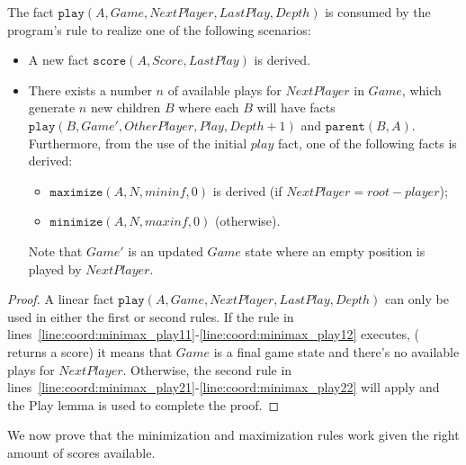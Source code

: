 \begin{lemma}

The fact $\mathtt{play}(A, Game, NextPlayer, LastPlay, Depth)$ is consumed by
the program's rule to realize one of the following scenarios:

\begin{itemize}
   \item A new fact $\mathtt{score}(A, Score, LastPlay)$ is derived.

   \item There exists a number $n$ of available plays for $NextPlayer$ in
      $Game$, which generate $n$ new children $B$ where each $B$ will have facts
      $\mathtt{play}(B, Game', OtherPlayer, Play, Depth + 1)$ and
      $\mathtt{parent}(B, A)$. Furthermore, from the use of the initial
      $play$ fact, one of the following facts is derived:

\begin{itemize}
   \item $\mathtt{maximize}(A, N, mininf, 0)$ is derived (if $NextPlayer =
      root-player$);
   \item $\mathtt{minimize}(A, N, maxinf, 0)$ (otherwise).
\end{itemize}

Note that $Game'$ is an updated $Game$ state where an empty position is played
by $NextPlayer$.

\end{itemize}

\end{lemma}
\begin{proof}

A linear fact $\mathtt{play}(A, Game, NextPlayer, LastPlay, Depth)$ can only be
used in either the first or second rules.  If the rule in
lines~\ref{line:coord:minimax_play11}-\ref{line:coord:minimax_play12} executes,
( returns a score) it means that $Game$ is a final game
state and there's no available plays for $NextPlayer$.  Otherwise, the second
rule in lines~\ref{line:coord:minimax_play21}-\ref{line:coord:minimax_play22}
will apply and the Play lemma is used to complete the proof.

\end{proof}

We now prove that the minimization and maximization rules work given the right
amount of scores available.


